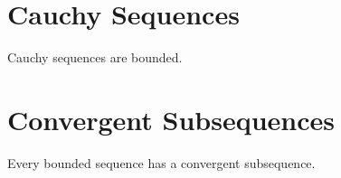 \section*{Cauchy Sequences}

\blindtext

\begin{lemma}
Cauchy sequences are bounded.
\end{lemma}

\blindtext

\section*{Convergent Subsequences}
\blindtext

\begin{theorem}
Every bounded sequence has a convergent subsequence.
\end{theorem}
